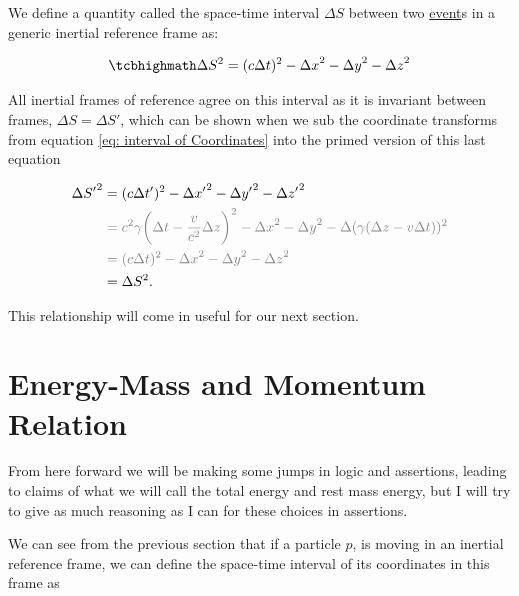 We define a quantity called the space-time interval $\Delta S$ between two \hyperlink{def-event}{event}s in a generic inertial reference frame as:

\begin{equation}
	\mhl{
	\Delta S^2 = (c\Delta t)^2-{\Delta x}^2-{\Delta y}^2-{\Delta z}^2
	}
	\label{eq: space-time interval}
\end{equation}

All inertial frames of reference agree on this interval as it is invariant between frames, $\Delta S = \Delta S{'}$, which can be shown when we sub the coordinate transforms from equation \eqref{eq: interval of Coordinates} into the primed version of this last equation

\begin{equation}
	\begin{aligned}
		\Delta S{'}^2 & = (c{\Delta t{'}})^2-\Delta x{'}^2-{\Delta y{'}}^2-{\Delta z{'}}^2                                                                                          \\
		              & \color{gray} = {c}^2{\gamma} \bigg( \Delta t-\frac{v}{{c}^2} {\Delta z} \bigg)^2-{\Delta x}^2-{\Delta y}^2-\Delta ({\gamma} ( {\Delta z}- {v} \Delta t) )^2 \\
		              & \color{gray} = (c\Delta t)^2-{\Delta x}^2-{\Delta y}^2-{\Delta z}^2                                                                                         \\
		              & = \Delta S^2.
	\end{aligned}
\end{equation}

This relationship will come in useful for our next section.

\section{Energy-Mass and Momentum Relation} \label{sect: Energy-Mass and Momentum Relation}

From here forward we will be making some jumps in logic and assertions, leading to claims of what we will call the total energy and rest mass energy, but I will try to give as much reasoning as I can for these choices in assertions.

We can see from the previous section that if a particle $p$, is moving in an inertial reference frame, we can define the space-time interval of its coordinates in this frame as

